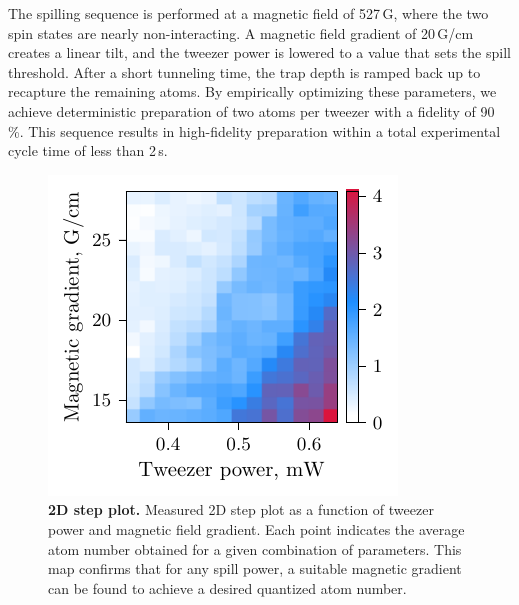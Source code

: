 The spilling sequence is performed at a magnetic field of 527\,G, where the two spin states are nearly non-interacting. A magnetic field gradient of 20\,G/cm creates a linear tilt, and the tweezer power is lowered to a value that sets the spill threshold. After a short tunneling time, the trap depth is ramped back up to recapture the remaining atoms. By empirically optimizing these parameters, we achieve deterministic preparation of two atoms per tweezer with a fidelity of 90\,\%. This sequence results in high-fidelity preparation within a total experimental cycle time of less than 2\,s.








\begin{figure}
    \centering
    \includegraphics{fig-py/step-plot-2d.pdf}
    \caption[2D step plot]{
        \textbf{2D step plot.}
        Measured 2D step plot as a function of tweezer power and magnetic field gradient. Each point indicates the average atom number obtained for a given combination of parameters. This map confirms that for any spill power, a suitable magnetic gradient can be found to achieve a desired quantized atom number.
    }
    \label{fig:spillingadd-2d}
\end{figure}

